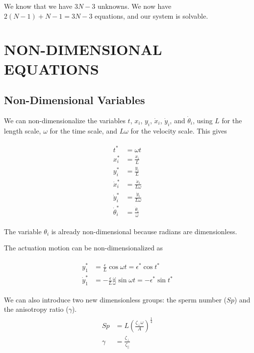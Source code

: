 \documentclass[12pt,letterpaper,titlepage]{article}
\begin{document}
We know that we have $3N-3$ unknowns. We now have $2(N-1) + N - 1 = 3N -3$ equations, and our system is solvable.

\newpage
\section{NON-DIMENSIONAL EQUATIONS}
\subsection{Non-Dimensional Variables}
We can non-dimensionalize the variables $t$, $x_i$, $y_i$, $\dot{x}_i$, $\dot{y}_i$, and $\dot{\theta}_i$, using $L$ for the length scale, $\omega$ for the time scale, and $L \omega$ for the velocity scale. This gives

\begin{align}
\begin{split}
t^* &= \omega t \\
x_i^*&= \frac{x_i}{L} \\
y_i^* &= \frac{y_i}{L} \\
\dot{x}_i^* &= \frac{\dot{x}_i}{L \omega} \\
\dot{y}_i^* &= \frac{\dot{y}_i}{L \omega} \\
\dot{\theta}_i^* &= \frac{\dot{\theta}_i}{\omega}
\end{split}
\end{align}

The variable $\theta_i$ is already non-dimensional because radians are dimensionless.

The actuation motion can be non-dimensionalized as

\begin{align}
\begin{split}
y_1^* &= \frac{\epsilon}{L} \cos \omega t = \epsilon^* \cos t^* \\
\dot{y}_1^* &= - \frac{\epsilon}{L} \frac{\omega}{\omega} \sin \omega t = - \epsilon^* \sin t^*
\end{split}
\end{align}

We can also introduce two new dimensionless groups: the sperm number ($Sp$) and the anisotropy ratio ($\gamma$).
\begin{align}
\begin{split}
Sp &= L(\frac{\zeta_{\bot} \omega}{A})^\frac{1}{4} \\
\gamma &= \frac{\zeta_{\bot}}{\zeta_{\parallel}}
\end{split}
\end{align}
\end{document}
